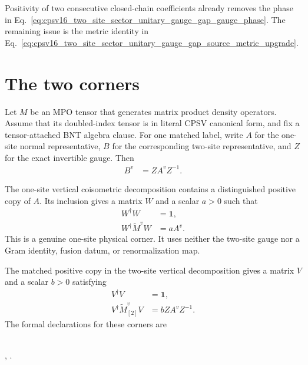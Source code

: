 \documentclass{article}
\begin{document}
Positivity of two consecutive closed-chain coefficients already removes the
phase in
Eq.~\ref{eq:cpsv16_two_site_sector_unitary_gauge_gap_gauge_phase}. The
remaining issue is the metric identity in
Eq.~\ref{eq:cpsv16_two_site_sector_unitary_gauge_gap_source_metric_upgrade}.

\section{The two corners}

Let $M$ be an MPO tensor that generates matrix product density operators.
Assume that its doubled-index tensor is in literal CPSV canonical form, and
fix a tensor-attached BNT algebra clause. For one matched label, write $A$ for
the one-site normal representative, $B$ for the corresponding two-site
representative, and $Z$ for the exact invertible gauge. Then
\begin{align}
    B^v
    &=ZA^vZ^{-1}.
    \label{eq:cpsv16_two_site_sector_unitary_gauge_gap_exact_gauge}
\end{align}

The one-site vertical coisometric decomposition contains a distinguished
positive copy of $A$. Its inclusion gives a matrix $W$ and a scalar $a>0$
such that
\begin{align}
    W^\dagger W
    &=\mathbf 1,
    \label{eq:cpsv16_two_site_sector_unitary_gauge_gap_one_site_inclusion_isometry}\\
    W^\dagger\widetilde M^vW
    &=aA^v.
    \label{eq:cpsv16_two_site_sector_unitary_gauge_gap_one_site_raw_corner}
\end{align}
This is a genuine one-site physical corner. It uses neither the two-site
gauge nor a Gram identity, fusion datum, or renormalization map.

The matched positive copy in the two-site vertical decomposition gives a
matrix $V$ and a scalar $b>0$ satisfying
\begin{align}
    V^\dagger V
    &=\mathbf 1,
    \label{eq:cpsv16_two_site_sector_unitary_gauge_gap_two_site_inclusion_isometry}\\
    V^\dagger\widetilde M_{[2]}^vV
    &=bZA^vZ^{-1}.
    \label{eq:cpsv16_two_site_sector_unitary_gauge_gap_two_site_gauge_corner}
\end{align}
The formal declarations for these corners are
\begin{center}
\scriptsize
\mbox{}\\
\mbox{,}\qquad
\mbox{.}
\end{center}
\end{document}
